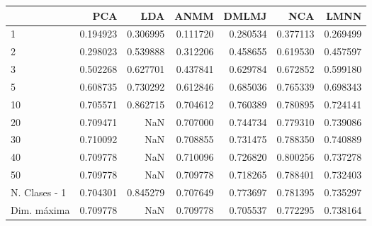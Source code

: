 \begin{tabular}{lrrrrrr}
\toprule
{} &       PCA &       LDA &      ANMM &     DMLMJ &       NCA &      LMNN \\
\midrule
1             &  0.194923 &  0.306995 &  0.111720 &  0.280534 &  0.377113 &  0.269499 \\
2             &  0.298023 &  0.539888 &  0.312206 &  0.458655 &  0.619530 &  0.457597 \\
3             &  0.502268 &  0.627701 &  0.437841 &  0.629784 &  0.672852 &  0.599180 \\
5             &  0.608735 &  0.730292 &  0.612846 &  0.685036 &  0.765339 &  0.698343 \\
10            &  0.705571 &  0.862715 &  0.704612 &  0.760389 &  0.780895 &  0.724141 \\
20            &  0.709471 &       NaN &  0.707000 &  0.744734 &  0.779310 &  0.739086 \\
30            &  0.710092 &       NaN &  0.708855 &  0.731475 &  0.788350 &  0.740889 \\
40            &  0.709778 &       NaN &  0.710096 &  0.726820 &  0.800256 &  0.737278 \\
50            &  0.709778 &       NaN &  0.709778 &  0.718265 &  0.788401 &  0.732403 \\
N. Clases - 1 &  0.704301 &  0.845279 &  0.707649 &  0.773697 &  0.781395 &  0.735297 \\
Dim. máxima   &  0.709778 &       NaN &  0.709778 &  0.705537 &  0.772295 &  0.738164 \\
\bottomrule
\end{tabular}
